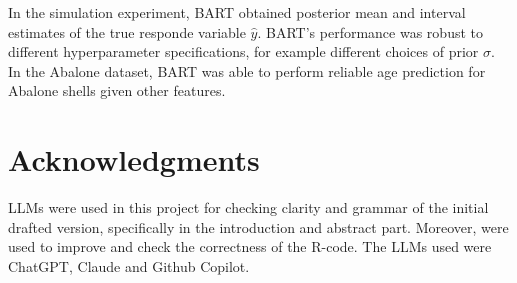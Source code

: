 \documentclass[a4paper,11pt]{article}
\begin{document}
 In the simulation experiment, BART obtained posterior
 mean and interval estimates of the true responde variable $\hat{y}$. BART's performance was robust to different hyperparameter specifications, for example different choices of prior $\sigma$. In the Abalone dataset, BART was able to perform reliable age prediction for Abalone shells given other features.


\section{Acknowledgments}
LLMs were used in this project for checking clarity and grammar of the initial drafted version, specifically in the introduction and abstract part. Moreover, were used to improve and check the correctness of the R-code. The LLMs used were ChatGPT, Claude and Github Copilot.


\newpage

\printbibliography
\end{document}
